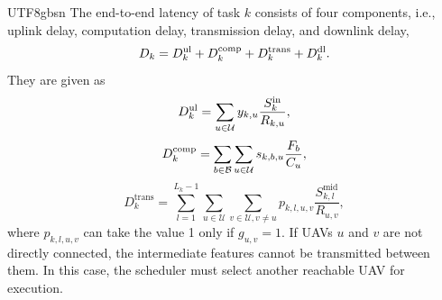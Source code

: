 \documentclass[journal]{IEEEtran}
\begin{document}
\begin{CJK*}{UTF8}{gbsn}
The end-to-end latency of task \(k\) consists of four components, i.e., uplink delay, computation delay, transmission delay, and downlink delay, 
\begin{equation}
D_k = D_k^{\rm ul} + D_k^{\rm comp} + D_k^{\rm trans} + D_k^{\rm dl}.
\end{equation}
They are given as %
\begin{equation}
D_k^{\rm ul} = \sum_{u \in \mathcal{U}} y_{k,u} \frac{S_k^{\rm in}}{R_{k,u}},
\end{equation}
\begin{equation}
D_k^{\rm comp} = \sum_{b \in \mathcal{B}} \sum_{u \in \mathcal{U}} s_{k,b,u} \frac{F_b}{C_u},
\end{equation}
{\color{black}
\begin{equation}
D_k^{\mathrm{trans}}
= \sum_{l=1}^{L_k-1}
  \sum_{u\in\mathcal{U}}\sum_{v\in\mathcal{U},v\ne u}
   p_{k,l,u,v}\frac{S_{k,l}^{\mathrm{mid}}}{R_{u,v}} ,
\end{equation}%
where \( p_{k,l,u,v} \) can take the value 1 only if \( g_{u,v} = 1 \). If UAVs \( u \) and \( v \) are not directly connected, the intermediate features cannot be transmitted between them. In this case, the scheduler must select another reachable UAV for execution. 
} 


\end{CJK*}
\end{document}
